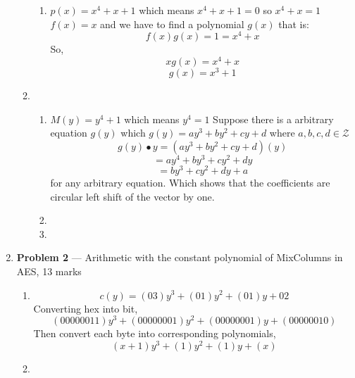 \documentclass[11pt]{article}
\theoremstyle{definition}
\begin{document}
\begin{enumerate}
\begin{enumerate}
\begin{enumerate}
			\item %
			$p(x) = x^{4}+x+1$ which means $x^{4}+x+1 = 0$ so $x^4+x=1$\newline
			$f(x) = x$ and we have to find a polynomial $g(x)$ that is:
			\[f(x)g(x) = 1 = x^4 + x\] So,
			\[xg(x) = x^4 + x\]
			\[g(x) = x^3 + 1\]
		
		\end{enumerate}
	
		\item %
		
		\begin{enumerate}
		
			\item %
			$M(y) = y^4 + 1$ which means $y^4 =1 $
			Suppose there is a arbitrary equation $g(y)$ which $g(y) = ay^3+by^2+cy+d$ where $a,b,c,d \in \mathcal{Z} $ 
			\[g(y) \bullet y  = (ay^3+by^2+cy+d)(y)\]
			\[=ay^4+by^3+cy^2+dy\]
			\[=by^3 + cy^2 +dy + a\]
			for any arbitrary equation. Which shows that the coefficients are circular left shift of the vector by one.
				
			\item %
				
			\item %
		\end{enumerate}
	\end{enumerate}
	
	\newpage
	\item[] \textbf{Problem 2} ---  Arithmetic with the constant polynomial of {\sc MixColumns} in
	    AES, 13 marks
	
	\begin{enumerate}
	
		\item %
			\[c(y)=(03)y^3 + (01)y^2 + (01)y + 02\]
			Converting hex into bit,
			\[(00000011)y^3+(00000001)y^2+(00000001)y+(00000010)\]
			Then convert each byte into corresponding polynomials,
			\[(x+1)y^3+(1)y^2+(1)y+(x)\]
		\item %
		

\end{enumerate}
\end{enumerate}
\end{document}
